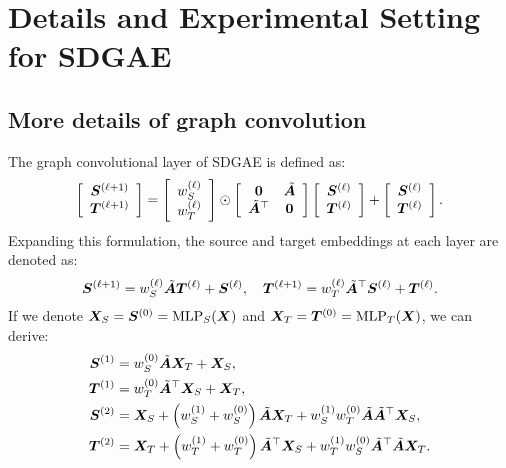 \hypertarget{app_sdgae}{} 
\section{Details and Experimental Setting for SDGAE}\label{app_sdgae}

\hypertarget{app_sdgae_conv}{} 
\subsection{More details of graph convolution}\label{app_sdgae_conv}
The graph convolutional layer of SDGAE is defined as: 
\begin{equation}\label{eq:app_bg_A_hat}
    \left[ 
        \begin{array}{c}
            {\bm{S}}^{(\ell+1)} \\
            {\bm{T}}^{(\ell+1)}
        \end{array}
    \right] =
    \left[ 
        \begin{array}{c}
            w^{(\ell)}_S \\
            w^{(\ell)}_T
        \end{array}
    \right] 
    \odot
    \left[ 
        \begin{array}{cc}
            \mathbf{0} & \Tilde{{\bm{A}}} \\
            \Tilde{{\bm{A}}}^{\top} & \mathbf{0}
        \end{array}
    \right]
    \left[ 
        \begin{array}{c}
            {\bm{S}}^{(\ell)} \\
            {\bm{T}}^{(\ell)}
        \end{array}
    \right] 
    +
    \left[ 
        \begin{array}{c}
            {\bm{S}}^{(\ell)} \\
            {\bm{T}}^{(\ell)}
        \end{array}
    \right].
\end{equation}
Expanding this formulation, the source and target embeddings at each layer are denoted as:
\begin{equation}\label{app_eq_sdgae}
    {\bm{S}}^{(\ell+1)} =w_{S}^{(\ell)}\Tilde{{\bm{A}}}{\bm{T}}^{(\ell)}+{\bm{S}}^{(\ell)}, \quad {\bm{T}}^{(\ell+1)} =w_{T}^{(\ell)}\Tilde{{\bm{A}}}^{\top}{\bm{S}}^{(\ell)}+{\bm{T}}^{(\ell)}.
\end{equation}
If we denote ${\bm{X}}_S = {\bm{S}}^{(0)}=\mathrm{MLP}_S({\bm{X}})$ and ${\bm{X}}_T = {\bm{T}}^{(0)}=\mathrm{MLP}_T({\bm{X}})$, we can derive:
\begin{align*}
{\bm{S}}^{(1)} &= w_{S}^{(0)}\Tilde{{\bm{A}}}{\bm{X}}_T + {\bm{X}}_S, \\
{\bm{T}}^{(1)} &= w_{T}^{(0)}\Tilde{{\bm{A}}}^{\top}{\bm{X}}_S + {\bm{X}}_T, \\
{\bm{S}}^{(2)} &= {\bm{X}}_S + \left(w_{S}^{(1)} + w_{S}^{(0)}\right)\Tilde{{\bm{A}}}{\bm{X}}_T + w_{S}^{(1)}w_{T}^{(0)}\Tilde{{\bm{A}}}\Tilde{{\bm{A}}}^{\top}{\bm{X}}_S, \\
{\bm{T}}^{(2)} &= {\bm{X}}_T + \left(w_{T}^{(1)} + w_{T}^{(0)}\right)\Tilde{{\bm{A}}}^{\top}{\bm{X}}_S + w_{T}^{(1)}w_{S}^{(0)}\Tilde{{\bm{A}}}^{\top}\Tilde{{\bm{A}}}{\bm{X}}_T.
\end{align*}
